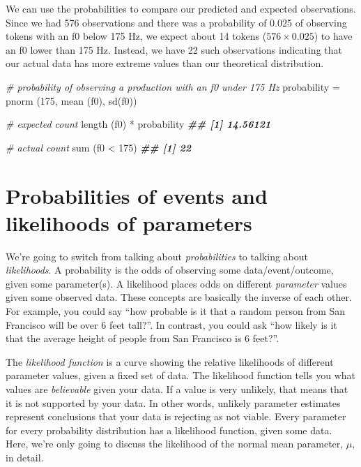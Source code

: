 \documentclass[
]{book}
\newenvironment{Shaded}{\begin{snugshade}}{\end{snugshade}}
\newcommand{\CommentTok}[1]{\textcolor[rgb]{0.56,0.35,0.01}{\textit{#1}}}
\newcommand{\DecValTok}[1]{\textcolor[rgb]{0.00,0.00,0.81}{#1}}
\newcommand{\DocumentationTok}[1]{\textcolor[rgb]{0.56,0.35,0.01}{\textbf{\textit{#1}}}}
\newcommand{\FunctionTok}[1]{\textcolor[rgb]{0.00,0.00,0.00}{#1}}
\newcommand{\NormalTok}[1]{#1}
\newcommand{\OtherTok}[1]{\textcolor[rgb]{0.56,0.35,0.01}{#1}}
\newcommand{\SpecialCharTok}[1]{\textcolor[rgb]{0.00,0.00,0.00}{#1}}
\begin{document}
We can use the probabilities to compare our predicted and expected observations. Since we had 576 observations and there was a probability of 0.025 of observing tokens with an f0 below 175 Hz, we expect about 14 tokens (\(576 \times 0.025\)) to have an f0 lower than 175 Hz. Instead, we have 22 such observations indicating that our actual data has more extreme values than our theoretical distribution.

\begin{Shaded}
\begin{Highlighting}[]
\CommentTok{\# probability of observing a production with an f0 under 175 Hz}
\NormalTok{probability }\OtherTok{=} \FunctionTok{pnorm}\NormalTok{ (}\DecValTok{175}\NormalTok{, }\FunctionTok{mean}\NormalTok{ (f0), }\FunctionTok{sd}\NormalTok{(f0)) }

\CommentTok{\# expected count}
\FunctionTok{length}\NormalTok{ (f0) }\SpecialCharTok{*}\NormalTok{ probability}
\DocumentationTok{\#\# [1] 14.56121}

\CommentTok{\# actual count}
\FunctionTok{sum}\NormalTok{ (f0 }\SpecialCharTok{\textless{}} \DecValTok{175}\NormalTok{)}
\DocumentationTok{\#\# [1] 22}
\end{Highlighting}
\end{Shaded}

\hypertarget{probabilities-of-events-and-likelihoods-of-parameters}{%
\section{Probabilities of events and likelihoods of parameters}\label{probabilities-of-events-and-likelihoods-of-parameters}}

We're going to switch from talking about \emph{probabilities} to talking about \emph{likelihoods}. A probability is the odds of observing some data/event/outcome, given some parameter(s). A likelihood places odds on different \emph{parameter} values given some observed data. These concepts are basically the inverse of each other. For example, you could say ``how probable is it that a random person from San Francisco will be over 6 feet tall?''. In contrast, you could ask ``how likely is it that the average height of people from San Francisco is 6 feet?''.

The \emph{likelihood function} is a curve showing the relative likelihoods of different parameter values, given a fixed set of data. The likelihood function tells you what values are \emph{believable} given your data. If a value is very unlikely, that means that it is not supported by your data. In other words, unlikely parameter estimates represent conclusions that your data is rejecting as not viable. Every parameter for every probability distribution has a likelihood function, given some data. Here, we're only going to discuss the likelihood of the normal mean parameter, \(\mu\), in detail.
\end{document}
